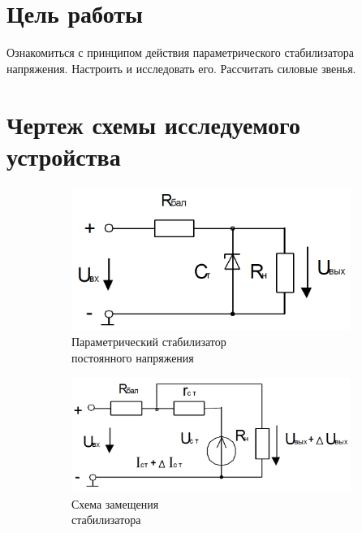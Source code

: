 





\section{Цель работы}

Ознакомиться с принципом действия параметрического стабилизатора напряжения. Настроить и исследовать его. Рассчитать силовые звенья.

\section{Чертеж схемы исследуемого устройства}

\begin{figure}[h]
\centering
\begin{subfigure}[b]{0.45\textwidth}
\includegraphics[scale=0.35]{img/stabilizator.png}
\caption{Параметрический стабилизатор\\ постоянного напряжения}\label{figure:2.1:a}
\end{subfigure}
\begin{subfigure}[b]{0.45\textwidth}
\includegraphics[scale=0.35]{img/substitution.png}
\caption{Схема замещения \\стабилизатора}\label{figure:2.1:b}
\end{subfigure}
\caption{}\label{figure:2.1}
\end{figure}


